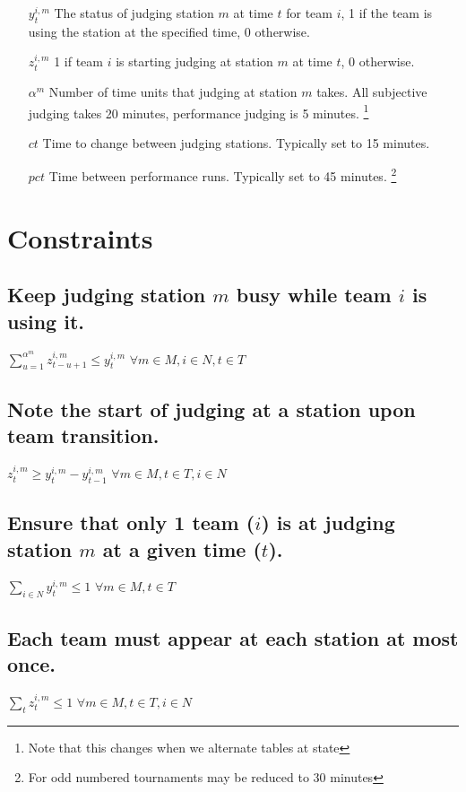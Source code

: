 \documentclass[letterpaper,11pt]{report}
\newcommand{\doccomment}[3]%
{\marginpar{\textcolor{#2}{\bf #1}}%
\footnote{{\color{#2}#3}}%
}
\newcommand{\doccomment}[3]{}
\newcommand{\jpscomment}[1]%
{\doccomment{SCHEWE}{Bittersweet}{#1}}
\begin{document}
\begin{itemize}
\item[$y_{t}^{i,m}$] The status of judging station $m$ at time $t$ for team
  $i$, 1 if the team is using the station at the specified time, 0 otherwise.

\item[$z_{t}^{i,m}$] 1 if team $i$ is starting judging at station $m$ at
  time $t$, 0 otherwise.
 
\item[$\alpha^{m}$] Number of time units that judging at station $m$
  takes. All subjective judging takes 20 minutes, performance judging is 5
  minutes. \jpscomment{Note that this changes when we alternate tables at state}

\item[$ct$] Time to change between judging stations. Typically set to 15
  minutes.
\item[$pct$] Time between performance runs. Typically set to 45
  minutes. \jpscomment{For odd numbered tournaments may be reduced to 30
    minutes}


\end{itemize}

\section{Constraints}

\subsection{Keep judging station $m$ busy while team $i$ is using it.}
$\sum\limits_{u=1}^{\alpha^{m}} z_{t-u+1}^{i,m} \le y_{t}^{i,m}$
\hfill $\forall m \in M, i \in N, t \in T$

\subsection{Note the start of judging at a station upon team transition.}
$z_{t}^{i,m} \ge y_{t}^{i,m} - y_{t-1}^{i,m}$
\hfill $\forall m \in M, t \in T, i \in N$

\subsection{Ensure that only 1 team ($i$) is at judging station $m$ at a given time
($t$).}
$\sum\limits_{i \in N} y_{t}^{i,m} \le 1$          
\hfill $\forall m \in M, t \in T$

\subsection{Each team must appear at each station at most once.}
$\sum\limits_{t} z_{t}^{i,m} \le 1$
\hfill $\forall m \in M, t \in T, i \in N$
\end{document}
